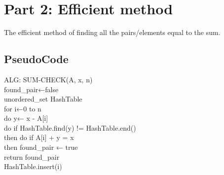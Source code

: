 \documentclass[12pt]{article}
\begin{document}
	\section{Part 2: Efficient method}
	The efficient method of finding all the pairs/elements equal to the sum.
	\subsection{PseudoCode}
	ALG: SUM-CHECK(A, x, n) \\
	\indent \indent found\_pair←false     \\
	\indent \indent unordered\_set HashTable \\
	\indent \indent \indent for i←0 to n \\
	\indent \indent \indent \indent do y← x - A[i] \\
	\indent \indent \indent \indent do if HashTable.find(y)  != HashTable.end() \\
	\indent \indent \indent \indent \indent \indent then do if A[i] + y = x \\
	\indent \indent \indent \indent \indent \indent \indent then found\_pair ← true \\
	\indent \indent \indent \indent \indent \indent \indent return found\_pair \\
	\indent \indent \indent HashTable.insert(i) \\
\end{document}
